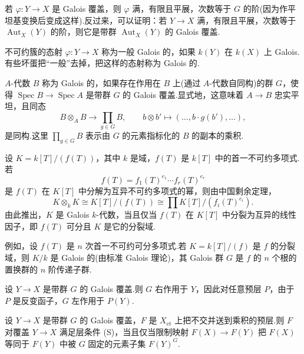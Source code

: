若 $\varphi \colon Y \to X$ 是 Galois 覆盖，则 $\varphi$ 满，有限且平展，次数等于 $G$ 的阶(因为作平坦基变换后变成这样).反过来，可以证明：若 $Y \to X$ 满，有限且平展，次数等于 $\operatorname{Aut}_X(Y)$ 的阶，则它是带群 $\operatorname{Aut}_X(Y)$ 的 Galois 覆盖.

\begin{remark}\label{rem:6.2}
不可约簇的态射 $\varphi \colon Y \to X$ 称为一般 Galois 的，如果 $k(Y)$ 在 $k(X)$ 上 Galois.有些坏蛋把``一般''去掉，把这样的态射称为 Galois 的.

$A$-代数 $B$ 称为 Galois 的，如果存在作用在 $B$ 上(通过 $A$-代数自同构)的群 $G$，使得 $\operatorname{Spec} B \to \operatorname{Spec} A$ 是带群 $G$ 的 Galois 覆盖.显式地，这意味着 $A \to B$ 忠实平坦，且同态
\[
B \otimes_{A} B \to \prod_{g \in G} B, \qquad b \otimes b' \mapsto (\ldots, b \cdot g(b'), \ldots),
\]
是同构.这里 $\prod_{g \in G} B$ 表示由 $G$ 的元素指标化的 $B$ 的副本的乘积.
\end{remark}

\begin{example}\label{ex:6.3}
设 $K = k[T]/(f(T))$，其中 $k$ 是域，$f(T)$ 是 $k[T]$ 中的首一不可约多项式.若
\[
f(T) = f_1(T)^{e_1} \cdots f_r(T)^{e_r}
\]
是 $f(T)$ 在 $K[T]$ 中分解为互异不可约多项式的幂，则由中国剩余定理，
\[
K \otimes_k K \cong K[T]/(f(T)) \cong \prod K[T]/(f_i(T)^{e_i}).
\]
由此推出，$K$ 是 Galois $k$-代数，当且仅当 $f(T)$ 在 $K[T]$ 中分裂为互异的线性因子，即 $f(T)$ 可分且 $K$ 是它的分裂域.

例如，设 $f(T)$ 是 $n$ 次首一不可约可分多项式.若 $K = k[T]/(f)$ 是 $f$ 的分裂域，则 $K/k$ 是 Galois 的(由标准 Galois 理论)，其 Galois 群 $G$ 是 $f$ 的 $n$ 个根的置换群的 $n$ 阶传递子群.
\end{example}

设 $Y \to X$ 是带群 $G$ 的 Galois 覆盖.则 $G$ 右作用于 $Y$，因此对任意预层 $P$，由于 $P$ 是反变函子，$G$ 左作用于 $P(Y)$.

\begin{proposition}\label{prop:6.4}
设 $Y \to X$ 是带群 $G$ 的 Galois 覆盖，$F$ 是 $X_{\mathrm{et}}$ 上把不交并送到乘积的预层.则 $F$ 对覆盖 $Y \to X$ 满足层条件 (S)，当且仅当限制映射 $F(X) \to F(Y)$ 把 $F(X)$ 等同于 $F(Y)$ 中被 $G$ 固定的元素子集 $F(Y)^{G}$.
\end{proposition}

